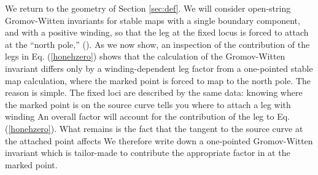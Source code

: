 \documentclass[a4paper,11pt]{article}
\begin{document}
We return to the geometry of Section \ref{sec:def}.
We will consider open-string Gromov-Witten invariants
for stable maps with a single boundary component,
and with a positive winding, so that the leg at the fixed
locus is forced to attach at the ``north pole,'' \coordHE{}
(\coordHE{}).
As we now show,
an inspection of the contribution of the legs
in Eq. \!\!(\ref{honehzero}) shows that the calculation
of the Gromov-Witten invariant differs only by a
winding-dependent leg
factor from a one-pointed stable map calculation,
where the marked point is forced to map to the north
pole.  The reason is simple.  The fixed loci are
described by the same data:  knowing where the marked
point is on the source curve tells you where to attach a
leg with winding \coordHE{}  An overall factor will account
for the contribution of the leg to
Eq. \!\!(\ref{honehzero}).  What remains is the fact
that the tangent to the source curve
at the attached point affects
\coordHE{}  We therefore write down a one-pointed
Gromov-Witten invariant which is tailor-made
to contribute the appropriate factor in \coordHE{}
at the marked
point.
\end{document}
